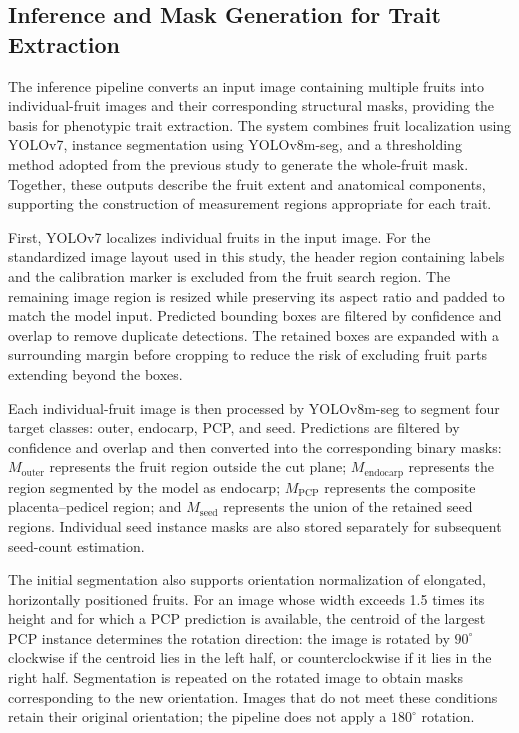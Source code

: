 \documentclass[final,5p,times,twocolumn]{elsarticle}
\begin{document}
\subsection*{Inference and Mask Generation for Trait Extraction}

The inference pipeline converts an input image containing multiple fruits into individual-fruit images and their corresponding structural masks, providing the basis for phenotypic trait extraction. The system combines fruit localization using YOLOv7, instance segmentation using YOLOv8m-seg, and a thresholding method adopted from the previous study to generate the whole-fruit mask. Together, these outputs describe the fruit extent and anatomical components, supporting the construction of measurement regions appropriate for each trait.

First, YOLOv7 localizes individual fruits in the input image. For the standardized image layout used in this study, the header region containing labels and the calibration marker is excluded from the fruit search region. The remaining image region is resized while preserving its aspect ratio and padded to match the model input. Predicted bounding boxes are filtered by confidence and overlap to remove duplicate detections. The retained boxes are expanded with a surrounding margin before cropping to reduce the risk of excluding fruit parts extending beyond the boxes.

Each individual-fruit image is then processed by YOLOv8m-seg to segment four target classes: outer, endocarp, PCP, and seed. Predictions are filtered by confidence and overlap and then converted into the corresponding binary masks: $M_{\mathrm{outer}}$ represents the fruit region outside the cut plane; $M_{\mathrm{endocarp}}$ represents the region segmented by the model as endocarp; $M_{\mathrm{PCP}}$ represents the composite placenta--pedicel region; and $M_{\mathrm{seed}}$ represents the union of the retained seed regions. Individual seed instance masks are also stored separately for subsequent seed-count estimation.

The initial segmentation also supports orientation normalization of elongated, horizontally positioned fruits. For an image whose width exceeds 1.5 times its height and for which a PCP prediction is available, the centroid of the largest PCP instance determines the rotation direction: the image is rotated by $90^{\circ}$ clockwise if the centroid lies in the left half, or counterclockwise if it lies in the right half. Segmentation is repeated on the rotated image to obtain masks corresponding to the new orientation. Images that do not meet these conditions retain their original orientation; the pipeline does not apply a $180^{\circ}$ rotation.
\end{document}
